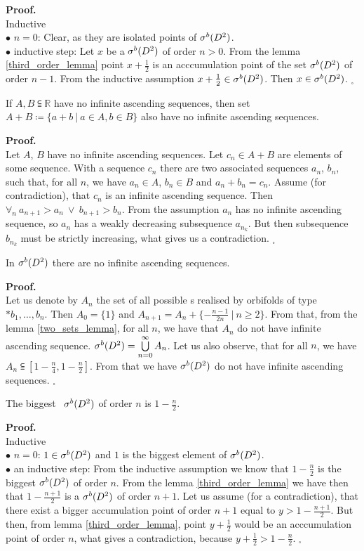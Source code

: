 \noindent\textbf{Proof.} \\
Inductive \\
$\bullet$ $n=0$: Clear, as they are isolated points of ${\mathcal{\sigma}^b(D^2)}$. \\
$\bullet$ inductive step: Let $x$ be a \apots  ${\mathcal{\sigma}^b(D^2)}$ of order $n>0$. From the lemma 
\ref{third_order_lemma} point $x+\frac{1}{2}$ is an acccumulation point of the set ${\mathcal{\sigma}^b(D^2)}$  
of order $n-1$. From the inductive assumption $x+\frac{1}{2} \in {\mathcal{\sigma}^b(D^2)}$. Then $x \in {\mathcal{\sigma}^b(D^2)}$. 
$_\square$ 
\begin{lemma}\label{two_sets_lemma}
If $A, B \subseteqq \mathbb{R}$ have no infinite ascending sequences, then set 
$A + B \coloneqq \{a+b\ |\ a \in A, b \in B\}$ also have no infinite ascending sequences. 
\end{lemma}
\noindent\textbf{Proof.} \\
Let $A$, $B$ have no infinite ascending sequences. 
Let $c_n \in A + B$ are elements of some sequence. With a sequence $c_n$ there are 
two associated sequences $a_n$, $b_n$, such that, for all $n$, we have $a_n \in A$, $b_n \in B$ and 
$a_n + b_n = c_n$. Assume (for contradiction), that $c_n$ is an infinite ascending sequence. 
Then $\forall_n\ a_{n+1}>a_n\ \lor\ b_{n+1} > b_n$. From the assumption $a_n$ has no infinite 
ascending sequence, so $a_n$ has a weakly decreasing subsequence $a_{n_k}$. But then 
subsequence $b_{n_k}$ must be strictly increasing, what gives 
us a contradiction. \Lightning $_\square$ 
\begin{lemma}\label{well_order}
In ${\mathcal{\sigma}^b(D^2)}$ there are no infinite ascending sequences.
\end{lemma}
\noindent\textbf{Proof.} \\
Let us denote by $A_n$ the set of all possible \Eoc s realised by orbifolds of type 
$*b_1,\dots,b_n$. Then $A_0 = \{1\}$ and $A_{n+1}=A_n+\{-\frac{n-1}{2n}\ |\ n\geq 2\}$. 
From that, from the lemma \ref{two_sets_lemma}, for all $n$, we have that $A_n$ do not have 
infinite ascending sequence. ${\mathcal{\sigma}^b(D^2)} = \bigcup\limits^\infty_{n=0}A_n$. Let us also observe, that 
for all $n$, we have $A_n \subseteqq [1-\frac{n}{4},1-\frac{n}{2}]$. From that we have ${\mathcal{\sigma}^b(D^2)}$ 
do not have infinite ascending sequences. $_\square$
\begin{theorem}\label{biggest \apots}
The biggest \apots\ ${\mathcal{\sigma}^b(D^2)}$ of order $n$ is $1-\frac{n}{2}$.
\end{theorem}
\noindent\textbf{Proof.}\\
Inductive \\
$\bullet$ $n=0$: $1\in {\mathcal{\sigma}^b(D^2)}$ and $1$ is the biggest element of ${\mathcal{\sigma}^b(D^2)}$. \\
$\bullet$ an inductive step: From the inductive assumption we know that $1-\frac{n}{2}$ is 
the biggest \apots  ${\mathcal{\sigma}^b(D^2)}$ of order $n$. From the lemma \ref{third_order_lemma} we have then 
that $1-\frac{n+1}{2}$ is a \apots  ${\mathcal{\sigma}^b(D^2)}$ of order $n+1$. Let us assume (for a contradiction), 
that there exist a bigger accumulation point of order $n+1$ equal to $y > 1-\frac{n+1}{2}$. 
But then, from lemma \ref{third_order_lemma}, point $y+\frac{1}{2}$ would be an acccumulation point 
of order $n$, what gives a contradiction, because $y+\frac{1}{2}>1-\frac{n}{2}$. $_\square$ 
